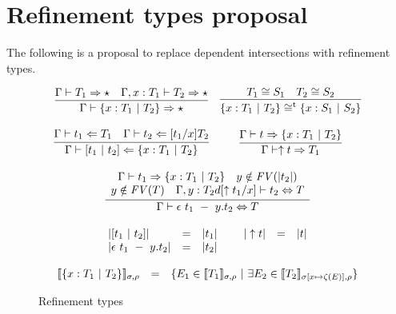 \documentclass{article}
\newcommand{\choice}[0]{\zeta}
\newcommand{\interp}[1]{\llbracket #1 \rrbracket}
\newcommand{\tpcheck}[0]{\Leftarrow}
\newcommand{\tpsynth}[0]{\Rightarrow}
\begin{document}
\section{Refinement types proposal}

The following is a proposal to replace dependent intersections with refinement
types.

\begin{figure}[h!]
  \centering
  \[
    \begin{array}{c}
      \begin{array}{cc}
        \infer{
        \Gamma \vdash \{ x : T_1\ |\ T_2\} \tpsynth \star
        }{
        \Gamma \vdash T_1 \tpsynth \star
        \quad \Gamma,x : T_1 \vdash T_2 \tpsynth \star
        }
        &
          \infer{
           \{ x : T_1\ |\ T_2\} \cong^{\text{t}} \{ x : S_1\ |\ S_2\}
          }{
           T_1 \cong S_1 \quad T_2 \cong S_2
          }
      \\ \\
        \infer{
         \Gamma \vdash [ t_1\ |\ t_2] \tpcheck \{ x : T_1\ |\ T_2\}
        }{
         \Gamma \vdash t_1 \tpcheck T_1
         \quad \Gamma \vdash t_2 \tpcheck [t_1/x]T_2
        }
        &
          \infer{
           \Gamma \vdash \uparrow t \tpsynth T_1
          }{
           \Gamma \vdash t \tpsynth \{ x : T_1\ |\ T_2\}
          }
      \end{array}
      \\ \\
      \infer{
       \Gamma \vdash \epsilon\ t_1\ -\ y.t_2 \Leftrightarrow T
      }{
      \begin{array}{c}
        \Gamma \vdash t_1 \tpsynth \{ x : T_1\ |\ T_2\}
        \quad y \notin \mathit{FV}(|t_2|)
        \\
        y \notin \mathit{FV}(T)
        \quad \Gamma, y : T_2d[\uparrow t_1/x] \vdash t_2 \Leftrightarrow T
      \end{array}
      }
      \\ \\
      \begin{array}{lllllll}
        |[ t_1\ |\ t_2]| & = & |t_1| &\
        & |\uparrow t| & = & |t|
        \\ |\epsilon\ t_1\ -\ y.t_2| & = & |t_2|
      \end{array}
      \\ \\
      \begin{array}{lll}
        \interp{\{ x : T_1\ |\ T_2 \}}_{\sigma,\rho}
        & =
        & \{E_1 \in \interp{T_1}_{\sigma,\rho}\ |\ \exists E_2 \in
          \interp{T_2}_{\sigma[x \mapsto \choice(E)],\rho}\}
      \end{array}
    \end{array}
  \]
  \caption{Refinement types}
  \label{fig:refinement-types}
\end{figure}
\end{document}
